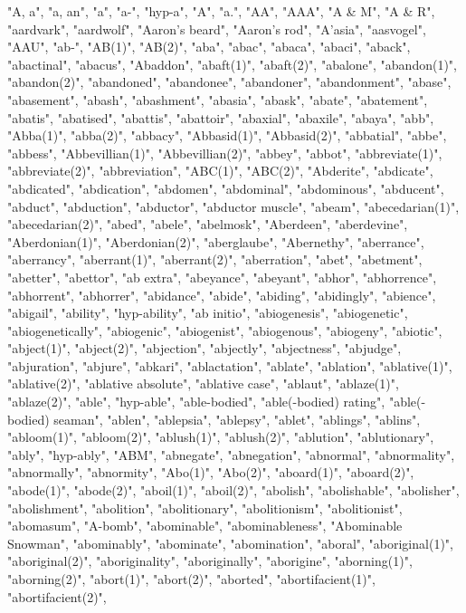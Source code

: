 "A, a",
"a, an",
"a",
"a-",
"hyp-a",
"A",
"a.",
"AA",
"AAA",
"A \& M",
"A \& R",
"aardvark",
"aardwolf",
"Aaron's beard",
"Aaron's rod",
"A'asia",
"aasvogel",
"AAU",
"ab-",
"AB(1)",
"AB(2)",
"aba",
"abac",
"abaca",
"abaci",
"aback",
"abactinal",
"abacus",
"Abaddon",
"abaft(1)",
"abaft(2)",
"abalone",
"abandon(1)",
"abandon(2)",
"abandoned",
"abandonee",
"abandoner",
"abandonment",
"abase",
"abasement",
"abash",
"abashment",
"abasia",
"abask",
"abate",
"abatement",
"abatis",
"abatised",
"abattis",
"abattoir",
"abaxial",
"abaxile",
"abaya",
"abb",
"Abba(1)",
"abba(2)",
"abbacy",
"Abbasid(1)",
"Abbasid(2)",
"abbatial",
"abbe",
"abbess",
"Abbevillian(1)",
"Abbevillian(2)",
"abbey",
"abbot",
"abbreviate(1)",
"abbreviate(2)",
"abbreviation",
"ABC(1)",
"ABC(2)",
"Abderite",
"abdicate",
"abdicated",
"abdication",
"abdomen",
"abdominal",
"abdominous",
"abducent",
"abduct",
"abduction",
"abductor",
"abductor muscle",
"abeam",
"abecedarian(1)",
"abecedarian(2)",
"abed",
"abele",
"abelmosk",
"Aberdeen",
"aberdevine",
"Aberdonian(1)",
"Aberdonian(2)",
"aberglaube",
"Abernethy",
"aberrance",
"aberrancy",
"aberrant(1)",
"aberrant(2)",
"aberration",
"abet",
"abetment",
"abetter",
"abettor",
"ab extra",
"abeyance",
"abeyant",
"abhor",
"abhorrence",
"abhorrent",
"abhorrer",
"abidance",
"abide",
"abiding",
"abidingly",
"abience",
"abigail",
"ability",
"hyp-ability",
"ab initio",
"abiogenesis",
"abiogenetic",
"abiogenetically",
"abiogenic",
"abiogenist",
"abiogenous",
"abiogeny",
"abiotic",
"abject(1)",
"abject(2)",
"abjection",
"abjectly",
"abjectness",
"abjudge",
"abjuration",
"abjure",
"abkari",
"ablactation",
"ablate",
"ablation",
"ablative(1)",
"ablative(2)",
"ablative absolute",
"ablative case",
"ablaut",
"ablaze(1)",
"ablaze(2)",
"able",
"hyp-able",
"able-bodied",
"able(-bodied) rating",
"able(-bodied) seaman",
"ablen",
"ablepsia",
"ablepsy",
"ablet",
"ablings",
"ablins",
"abloom(1)",
"abloom(2)",
"ablush(1)",
"ablush(2)",
"ablution",
"ablutionary",
"ably",
"hyp-ably",
"ABM",
"abnegate",
"abnegation",
"abnormal",
"abnormality",
"abnormally",
"abnormity",
"Abo(1)",
"Abo(2)",
"aboard(1)",
"aboard(2)",
"abode(1)",
"abode(2)",
"aboil(1)",
"aboil(2)",
"abolish",
"abolishable",
"abolisher",
"abolishment",
"abolition",
"abolitionary",
"abolitionism",
"abolitionist",
"abomasum",
"A-bomb",
"abominable",
"abominableness",
"Abominable Snowman",
"abominably",
"abominate",
"abomination",
"aboral",
"aboriginal(1)",
"aboriginal(2)",
"aboriginality",
"aboriginally",
"aborigine",
"aborning(1)",
"aborning(2)",
"abort(1)",
"abort(2)",
"aborted",
"abortifacient(1)",
"abortifacient(2)",
